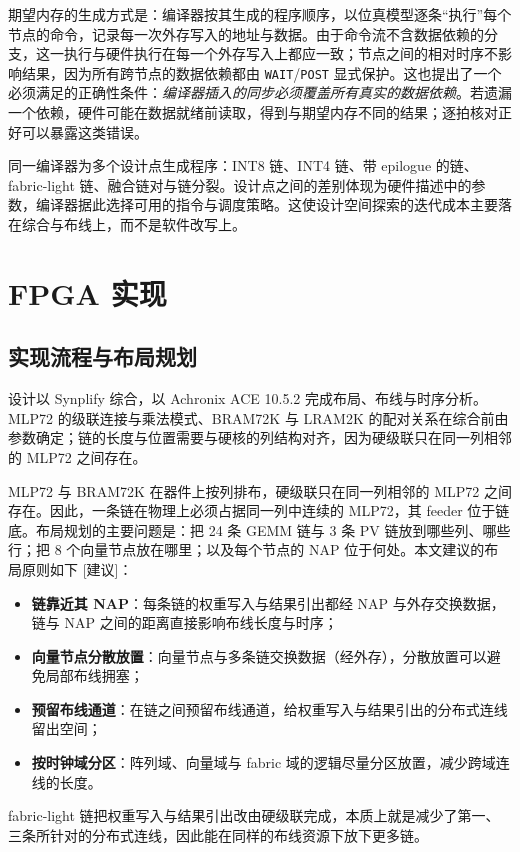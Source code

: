 \documentclass[a4paper,10.5pt]{ctexart}
\newcommand{\tR}{\textsf{[建议]}}           %
\begin{document}
期望内存的生成方式是：编译器按其生成的程序顺序，以位真模型逐条“执行”每个节点的命令，记录每一次外存写入的地址与数据。由于命令流不含数据依赖的分支，这一执行与硬件执行在每一个外存写入上都应一致；节点之间的相对时序不影响结果，因为所有跨节点的数据依赖都由 \texttt{WAIT}/\texttt{POST} 显式保护。这也提出了一个必须满足的正确性条件：\emph{编译器插入的同步必须覆盖所有真实的数据依赖}。若遗漏一个依赖，硬件可能在数据就绪前读取，得到与期望内存不同的结果；逐拍核对正好可以暴露这类错误。

同一编译器为多个设计点生成程序：INT8 链、INT4 链、带 epilogue 的链、fabric-light 链、融合链对与链分裂。设计点之间的差别体现为硬件描述中的参数，编译器据此选择可用的指令与调度策略。这使设计空间探索的迭代成本主要落在综合与布线上，而不是软件改写上。


\section{FPGA 实现}\label{sec:impl}

\subsection{实现流程与布局规划}

设计以 Synplify 综合，以 Achronix ACE 10.5.2 完成布局、布线与时序分析。MLP72 的级联连接与乘法模式、BRAM72K 与 LRAM2K 的配对关系在综合前由参数确定；链的长度与位置需要与硬核的列结构对齐，因为硬级联只在同一列相邻的 MLP72 之间存在。

MLP72 与 BRAM72K 在器件上按列排布，硬级联只在同一列相邻的 MLP72 之间存在。因此，一条链在物理上必须占据同一列中连续的 MLP72，其 feeder 位于链底。布局规划的主要问题是：把 24 条 GEMM 链与 3 条 PV 链放到哪些列、哪些行；把 8 个向量节点放在哪里；以及每个节点的 NAP 位于何处。本文建议的布局原则如下 \tR：
\begin{itemize}
  \item \textbf{链靠近其 NAP}：每条链的权重写入与结果引出都经 NAP 与外存交换数据，链与 NAP 之间的距离直接影响布线长度与时序；
  \item \textbf{向量节点分散放置}：向量节点与多条链交换数据（经外存），分散放置可以避免局部布线拥塞；
  \item \textbf{预留布线通道}：在链之间预留布线通道，给权重写入与结果引出的分布式连线留出空间；
  \item \textbf{按时钟域分区}：阵列域、向量域与 fabric 域的逻辑尽量分区放置，减少跨域连线的长度。
\end{itemize}
fabric-light 链把权重写入与结果引出改由硬级联完成，本质上就是减少了第一、三条所针对的分布式连线，因此能在同样的布线资源下放下更多链。
\end{document}
